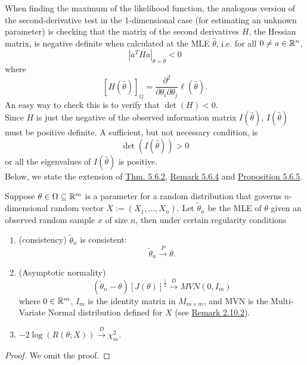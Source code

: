 \documentclass[11pt,fleqn]{book} %
\begin{document}
\begin{remark} \label{rmk:619}
When finding the maximum of the likelihood function, the analogous version of the second-derivative test in the 1-dimensional case (for estimating an unknown parameter) is checking that the matrix of the second derivatives \(H\), the Hessian matrix, is negative definite when calculated at the MLE \(\hat{\theta}\), i.e. for all \(0 \neq a \in \mathbb{R}^n\),
\[
\left|a^THa\right|_{\theta = \hat{\theta}} < 0
\]
where
\[
[H(\hat{\theta})]_{ij} = \frac{\partial^2}{\partial\theta_i\partial\theta_j}\ell(\hat{\theta}).
\]
\indent An easy way to check this is to verify that \(\det(H) < 0\). \\
\indent Since \(H\) is just the negative of the observed information matrix \(I(\hat{\theta})\), \(I(\hat{\theta})\) must be positive definite. A sufficient, but not necessary condition, is
\[
\det(I(\hat{\theta})) > 0
\]
or all the eigenvalues of \(I(\hat{\theta})\) is positive. \\
\indent Below, we state the extension of \hyperref[thm:562]{Thm. 5.6.2}, \hyperref[rmk:564]{Remark 5.6.4} and \hyperref[prop:565]{Proposition 5.6.5}.
\end{remark}

\begin{theorem} \label{thm:6110}
Suppose \(\theta \in \Omega \subseteq \mathbb{R}^m\) is a parameter for a random distribution that governs \(n\)-dimensional random vector \(X := (X_1, \ldots, X_n)\). Let \(\tilde{\theta}_n\) be the MLE of \(\theta\) given an observed random sample \(x\) of size \(n\), then under certain regularity conditions
\begin{enumerate}
\item (consistency) \(\tilde{\theta}_n\) is consistent:
\[
\tilde{\theta}_n \xrightarrow{P} \theta.
\]
\item (Asymptotic normality)
\[
(\tilde{\theta}_n - \theta)[J(\theta)]^{\frac12} \xrightarrow{D} MVN(0, I_m)
\]
where \(0 \in \mathbb{R}^m\), \(I_m\) is the identity matrix in \(M_{m \times m}\), and MVN is the Multi-Variate Normal distribution defined for \(X\) (see \hyperref[rmk:2102]{Remark 2.10.2}).
\item \(-2\log(R(\theta; X)) \xrightarrow{D} \chi^2_m\).
\end{enumerate}
\end{theorem}
\begin{proof} We omit the proof.\end{proof}
\end{document}
